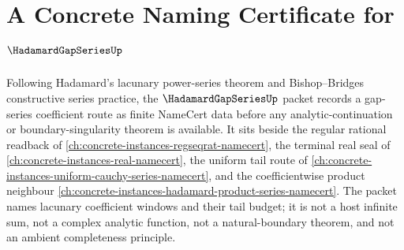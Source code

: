 \chapter{A Concrete Naming Certificate for $\HadamardGapSeriesUp$}
\label{ch:concrete-instances-hadamard-gap-series-namecert}

Following Hadamard's lacunary power-series theorem and Bishop--Bridges constructive series practice, the $\HadamardGapSeriesUp$ packet records a gap-series coefficient route as finite NameCert data before any analytic-continuation or boundary-singularity theorem is available. It sits beside the regular rational readback of \autoref{ch:concrete-instances-regseqrat-namecert}, the terminal real seal of \autoref{ch:concrete-instances-real-namecert}, the uniform tail route of \autoref{ch:concrete-instances-uniform-cauchy-series-namecert}, and the coefficientwise product neighbour \autoref{ch:concrete-instances-hadamard-product-series-namecert}. The packet names lacunary coefficient windows and their tail budget; it is not a host infinite sum, not a complex analytic function, not a natural-boundary theorem, and not an ambient completeness principle.

